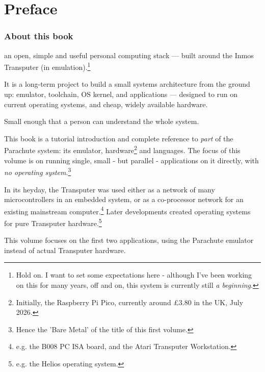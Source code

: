 \documentclass[a4paper]{tufte-book}
\begin{document}



    
\pagebreak
\part{Preface}
\section{About this book}
     an open, simple and useful personal computing stack — built around the Inmos Transputer (in emulation).\footnote{Hold on. I want to set some expectations here - although I've been working on this for many years, off and on, this system is currently still \textit{a beginning}.} \\
\vspace{5mm}
\vspace{5mm}
        
	It is a long-term project to build a small systems architecture
        from the ground up: emulator, toolchain, OS kernel, and applications — designed
        to run on current operating systems, and cheap, widely available hardware.

\vspace{5mm}
    Small enough that a person can understand the whole system.
\vspace{5mm}

	This book is a tutorial introduction and complete reference to \textit{part} of the Parachute system: its emulator, hardware\footnote{Initially, the Raspberry Pi Pico, currently around £3.80 in the UK, July 2026.} and languages. The focus of this volume is on running single, small - but parallel - applications on it directly, with \textit{no operating system}.\footnote{Hence the 'Bare Metal' of the title of this first volume.}
	
	In its heyday, the Transputer was used either as a network of many microcontrollers in an embedded system, or as a co-processor network for an existing mainstream computer.\footnote{e.g. the B008 PC ISA board, and the Atari Transputer Workstation.} Later developments created operating systems for pure Transputer hardware.\footnote{e.g. the Helios operating system.} 
	
	This volume focuses on the first two applications, using the Parachute emulator instead of actual Transputer hardware.
		
\end{document}
